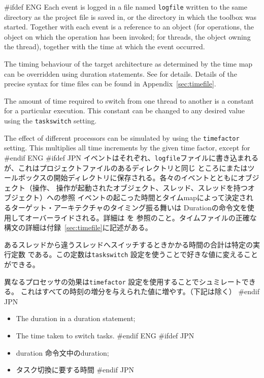 \documentclass[\pformat,12pt]{article}
\begin{document}
#ifdef ENG
Each event is logged in a file named \texttt{logfile} written to the
same directory as the project file is saved in, or the directory in
which the toolbox was started. Together with each event is a reference
to an object (for operations, the object on which the operation has
been invoked; for threads, the object owning the thread), together
with the time at which the event occurred.

The timing behaviour of the target architecture as determined by the
time map can be overridden using duration statements. See
\cite{LangManPP-CSK} for details. Details of the precise syntax for time
files can be found in Appendix~\ref{sec:timefile}.

The amount of time required to switch from one thread to another is a
constant for a particular execution. This constant can be changed to
any desired value using the \texttt{taskswitch} setting.

The effect of different processors can be simulated by using the
\texttt{timefactor} setting. This multiplies all time increments by
the given time factor, except for
#endif ENG
#ifdef JPN
イベントはそれぞれ、\texttt{logfile}ファイルに書き込まれるが、これはプロジェクトファイルのあるディレクトリと同じ
ところにまたはツールボックスの開始ディレクトリに保存される。各々のイベントとともにオブジェクト（操作、
操作が起動されたオブジェクト、スレッド、スレッドを持つオブジェクト）への参照
イベントの起こった時間とタイムmapによって決定されるターゲット・アーキテクチャのタイミング振る舞いは
Durationの命令文を使用してオーバーライドされる。詳細は\cite{LangManPP-CSK} を
参照のこと。タイムファイルの正確な構文の詳細は付録~\ref{sec:timefile}に記述がある。

あるスレッドから違うスレッドへスイッチするときかかる時間の合計は特定の実行定数
である。この定数は\texttt{taskswitch} 設定を使うことで好きな値に変えることができる。

異なるプロセッサの効果は\texttt{timefactor} 設定を使用することでシュミレートできる。
これはすべての時刻の増分を与えられた値に増やす。（下記は除く）
#endif JPN

\begin{itemize}
#ifdef ENG
\item The duration in a duration statement;
\item The time taken to switch tasks.
#endif ENG
#ifdef JPN
\item duration 命令文中のduration;
\item タスク切換に要する時間
#endif JPN
\end{itemize}
\end{document}
